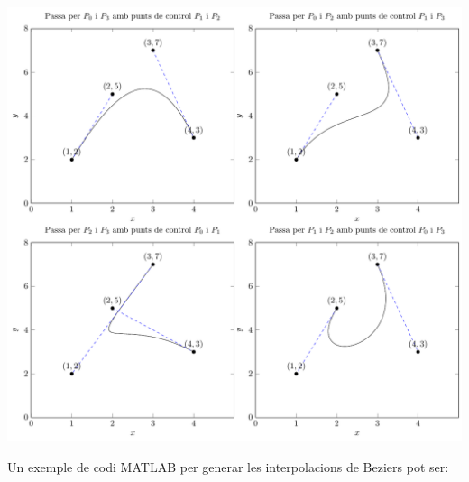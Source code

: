 \begin{enumerate}
\begin{enumerate}
\end{enumerate}

\begin{minipage}[t]{\linewidth}
  \vspace{-2ex}
  \includegraphics[width=\textwidth]{../figures/interpolaciobeziers.pdf}
  \label{fig:interpolaciobeziers}
\end{minipage}
Un exemple de codi MATLAB per generar les interpolacions de Beziers pot ser:


\end{enumerate}

